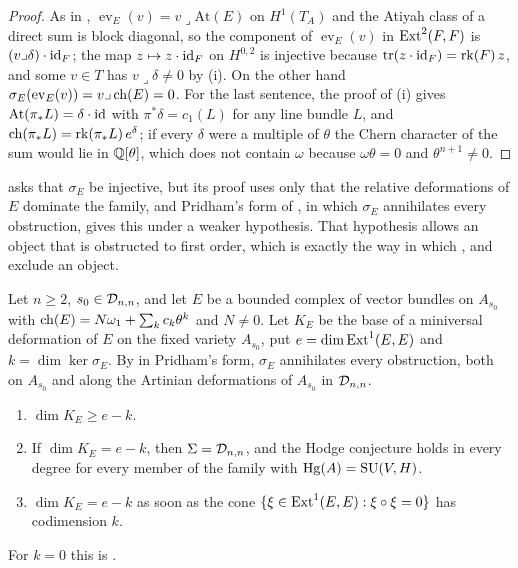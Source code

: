 \begin{proof}
As in , $\operatorname{ev}_{E}(v)=v\lrcorner\mathrm{At}(E)$
on $H^{1}(T_{A})$ and the Atiyah class of a direct sum is block diagonal, so
the component of $\operatorname{ev}_{E}(v)$ in $\operatorname{Ext}^{2}(F,F)$ is
$(v\lrcorner\delta)\cdot\operatorname{id}_{F}$; the map $z\mapsto z\cdot\operatorname{id}_{F}$ on
$H^{0,2}$ is injective because $\mathrm{tr}(z\cdot\operatorname{id}_{F})=\operatorname{rk}(F)\,z$, and
some $v\in T$ has $v\lrcorner\delta\ne0$ by (i). On the
other hand $\sigma_{E}(\operatorname{ev}_{E}(v))=v\lrcorner\operatorname{ch}(E)=0$. For the
last sentence, the proof of (i) gives
$\mathrm{At}(\pi_{*}L)=\delta\cdot\operatorname{id}$ with $\pi^{*}\delta=c_{1}(L)$ for any
line bundle $L$, and $\operatorname{ch}(\pi_{*}L)=\operatorname{rk}(\pi_{*}L)\,e^{\delta}$; if every
$\delta$ were a multiple of $\theta$ the Chern character of the sum would lie
in $\mathbb{Q}[\theta]$, which does not contain $\omega$ because $\omega\theta=0$ and
$\theta^{n+1}\ne0$.
\end{proof}

 asks that $\sigma_{E}$ be injective, but its proof
uses only that the relative deformations of $E$ dominate the family, and
Pridham's form of , in which $\sigma_{E}$ annihilates every
obstruction, gives this under a weaker hypothesis. That hypothesis allows an
object that is obstructed to first order, which is exactly the way in which
,  and  exclude
an object.

\begin{proposition}\label{prop:p2flat}
Let $n\ge2$, $s_{0}\in\mathcal{D}_{n,n}$, and let $E$ be a bounded complex of vector
bundles on $A_{s_{0}}$ with $\operatorname{ch}(E)=N\omega_{1}+\sum_{k}c_{k}\theta^{k}$ and
$N\ne0$. Let $K_{E}$ be the base of a miniversal deformation of $E$ on the
fixed variety $A_{s_{0}}$, put $e=\dim\operatorname{Ext}^{1}(E,E)$ and
$k=\dim\ker\sigma_{E}$. By  in Pridham's form, $\sigma_{E}$
annihilates every obstruction, both on $A_{s_{0}}$ and along the Artinian
deformations of $A_{s_{0}}$ in $\mathcal{D}_{n,n}$.
\begin{enumerate}[label=\textup{(\roman*)},leftmargin=2.6em,itemsep=2pt]
\item $\dim K_{E}\ge e-k$.
\item If $\dim K_{E}=e-k$, then $\Sigma=\mathcal{D}_{n,n}$, and the Hodge conjecture
  holds in every degree for every member of the family with
  $\operatorname{Hg}(A)=\operatorname{SU}(V,H)$.
\item $\dim K_{E}=e-k$ as soon as the cone
  $\{\xi\in\operatorname{Ext}^{1}(E,E):\xi\circ\xi=0\}$ has codimension $k$.
\end{enumerate}
For $k=0$ this is .
\end{proposition}

